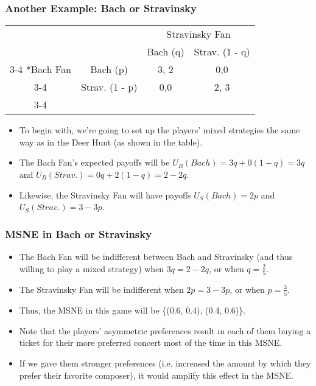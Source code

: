 \begin{frame}
\frametitle{Another Example: Bach or Stravinsky}
\begin{table}[h]
	\centering
	\begin{tabular}{cc|c|c|}
		& \multicolumn{1}{c}{} & \multicolumn{2}{c}{Stravinsky Fan}\\
		& \multicolumn{1}{c}{} & \multicolumn{1}{c}{Bach (q)}  & \multicolumn{1}{c}{Strav. (1 - q)} \\\cline{3-4}
		\multirow{2}*{Bach Fan}  & Bach (p) & 3, 2 & 0,0 \\\cline{3-4}
		& Strav. (1 - p) & 0,0 & 2, 3 \\\cline{3-4}
	\end{tabular}
\end{table}
\begin{itemize}
	\item To begin with, we're going to set up the players' mixed strategies the same way as in the Deer Hunt (as shown in the table).
	\item The Bach Fan's expected payoffs will be $U_B(Bach) = 3q + 0(1 - q) = 3q$ and $U_B(Strav.) = 0q + 2(1 - q) = 2 - 2q$.
	\item Likewise, the Stravinsky Fan will have payoffs $U_S(Bach) = 2p$ and $U_S(Strav.) = 3 - 3p$.
\end{itemize}
\end{frame}

\begin{frame}
\frametitle{MSNE in Bach or Stravinsky}
\begin{itemize}
\item The Bach Fan will be indifferent between Bach and Stravinsky (and thus willing to play a mixed strategy) when $3q = 2 - 2q$, or when $q = \frac{2}{5}$.
\item The Stravinsky Fan will be indifferent when $2p = 3 - 3p$, or when $p = \frac{3}{5}$.
\item Thus, the MSNE in this game will be \{(0.6, 0.4), (0.4, 0.6)\}.
\item Note that the players' asymmetric preferences result in each of them buying a ticket for their more preferred concert most of the time in this MSNE.
\item If we gave them stronger preferences (i.e. increased the amount by which they prefer their favorite composer), it would amplify this effect in the MSNE.
\end{itemize}
\end{frame}

